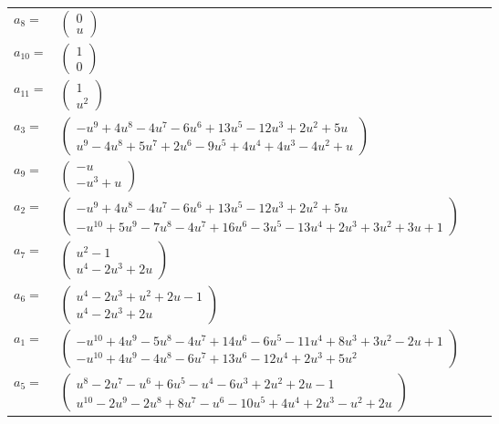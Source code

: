 \documentclass[1p]{elsarticle_modified}
\theoremstyle{definition}
\begin{document}
\begin{tabular}{m{7pt} m{180pt} m{7pt} m{180pt} }
\flushright $a_{8}=$&$\begin{pmatrix}0\\u\end{pmatrix}$ \\
\flushright $a_{10}=$&$\begin{pmatrix}1\\0\end{pmatrix}$ \\
\flushright $a_{11}=$&$\begin{pmatrix}1\\u^2\end{pmatrix}$ \\
\flushright $a_{3}=$&$\begin{pmatrix}- u^9+4 u^8-4 u^7-6 u^6+13 u^5-12 u^3+2 u^2+5 u\\u^9-4 u^8+5 u^7+2 u^6-9 u^5+4 u^4+4 u^3-4 u^2+u\end{pmatrix}$ \\
\flushright $a_{9}=$&$\begin{pmatrix}- u\\- u^3+u\end{pmatrix}$ \\
\flushright $a_{2}=$&$\begin{pmatrix}- u^9+4 u^8-4 u^7-6 u^6+13 u^5-12 u^3+2 u^2+5 u\\- u^{10}+5 u^9-7 u^8-4 u^7+16 u^6-3 u^5-13 u^4+2 u^3+3 u^2+3 u+1\end{pmatrix}$ \\
\flushright $a_{7}=$&$\begin{pmatrix}u^2-1\\u^4-2 u^3+2 u\end{pmatrix}$ \\
\flushright $a_{6}=$&$\begin{pmatrix}u^4-2 u^3+u^2+2 u-1\\u^4-2 u^3+2 u\end{pmatrix}$ \\
\flushright $a_{1}=$&$\begin{pmatrix}- u^{10}+4 u^9-5 u^8-4 u^7+14 u^6-6 u^5-11 u^4+8 u^3+3 u^2-2 u+1\\- u^{10}+4 u^9-4 u^8-6 u^7+13 u^6-12 u^4+2 u^3+5 u^2\end{pmatrix}$ \\
\flushright $a_{5}=$&$\begin{pmatrix}u^8-2 u^7- u^6+6 u^5- u^4-6 u^3+2 u^2+2 u-1\\u^{10}-2 u^9-2 u^8+8 u^7- u^6-10 u^5+4 u^4+2 u^3- u^2+2 u\end{pmatrix}$ \\

\end{tabular}
\end{document}
